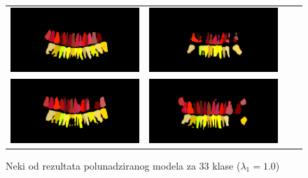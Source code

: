 \begin{figure}
\begin{tabular}{cccc}
\hspace{-1.5cm}
{\includegraphics[width = 8cm]{slike/rezultati/semisuper33klase1.png}} &
{\includegraphics[width = 8cm]{slike/rezultati/semisuper33klase2.png}}\\
\hspace{-1.5cm}
{\includegraphics[width = 8cm]{slike/rezultati/semisuper33klase3.png}} &
{\includegraphics[width = 8cm]{slike/rezultati/semisuper33klase4.png}}\\
\end{tabular}
\caption{Neki od rezultata polunadziranog modela za 33 klase ($\lambda_{1} = 1.0$)}
\end{figure}


